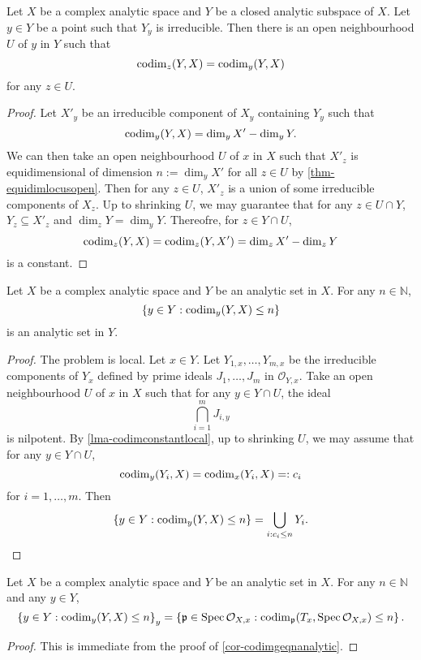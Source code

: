\begin{lemma}\label{lma-codimconstantlocal}
    Let $X$ be a complex analytic space and $Y$ be a closed analytic subspace of $X$. Let $y\in Y$ be a point such that $Y_y$ is irreducible. Then there is an open neighbourhood $U$ of $y$ in $Y$ such that 
    \[
        \operatorname{codim}_z(Y,X)=\operatorname{codim}_y(Y,X)  
    \]
    for any $z\in U$.
\end{lemma}
\begin{proof}
    Let $X'_y$ be an irreducible component of $X_y$ containing $Y_y$ such that 
    \[
        \operatorname{codim}_y(Y,X)=\dim_y X'-\dim_y  Y.
    \]
    We can then take an open neighbourhood $U$ of $x$ in $X$ such that $X'_z$ is equidimensional of dimension $n:=\dim_y X'$ for all $z\in U$ by \cref{thm-equidimlocusopen}. Then for any $z\in U$, $X'_z$ is a union of some irreducible components of $X_z$. Up to shrinking $U$, we may guarantee that for any $z\in U\cap Y$, $Y_z\subseteq X'_z$ and $\dim_z Y=\dim_y Y$. Thereofre, for $z\in Y\cap U$,
    \[
        \operatorname{codim}_z(Y,X)=\operatorname{codim}_z(Y,X')=\dim_z X'-\dim_z Y  
    \]
    is a constant.
\end{proof}

\begin{corollary}\label{cor-codimgeqnanalytic}
    Let $X$ be a complex analytic space and $Y$ be an analytic set in $X$. For any $n\in \mathbb{N}$, 
    \[
        \left\{ y\in Y: \operatorname{codim}_y(Y,X)\leq n\right\}
    \]
    is an analytic set in $Y$.
\end{corollary}
\begin{proof}
    The problem is local. Let $x\in Y$. Let $Y_{1,x},\ldots,Y_{m,x}$ be the irreducible components of $Y_x$ defined by prime ideals $J_1,\ldots,J_m$ in $\mathcal{O}_{Y,x}$. Take an open neighbourhood $U$ of $x$ in $X$ such that for any $y\in Y\cap U$, the ideal 
    \[
        \bigcap_{i=1}^m J_{i,y}  
    \]
    is nilpotent. By \cref{lma-codimconstantlocal}, up to shrinking $U$, we may assume that for any $y\in Y\cap U$,
    \[
        \operatorname{codim}_y(Y_i,X)=\operatorname{codim}_x(Y_i,X)=:c_i  
    \]
    for $i=1,\ldots,m$. Then 
    \[
        \left\{ y\in Y: \operatorname{codim}_y(Y,X)\leq n\right\}=\bigcup_{i:c_i\leq n} Y_i.  
    \]
\end{proof}

\begin{corollary}\label{cor-codimgeqngerm}
    Let $X$ be a complex analytic space and $Y$ be an analytic set in $X$. For any $n\in \mathbb{N}$ and any $y\in Y$,
    \[
        \left\{ y\in Y: \operatorname{codim}_y(Y,X)\leq n\right\}_y=\left\{\mathfrak{p}\in \operatorname{Spec} \mathcal{O}_{X,x}: \operatorname{codim}_{\mathfrak{p}}(T_x,\operatorname{Spec} \mathcal{O}_{X,x})\leq n \right\}.
    \]
\end{corollary}
\begin{proof}
    This is immediate from the proof of \cref{cor-codimgeqnanalytic}.
\end{proof}


